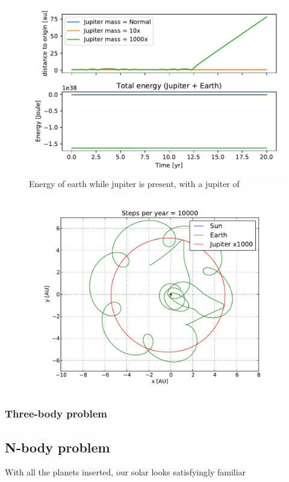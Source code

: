 \documentclass[10pt]{article}
\begin{document}
\begin{multicols}{2}
\begin{figure}[htpb]
    \centering
    \includegraphics[width=0.8\linewidth]{energyEarthJupiter.pdf}
    \caption{Energy of earth while jupiter is present, with a jupiter of  }
    \label{fig:energy_earthJupiter}
\end{figure}

\begin{figure}[H]
    \centering
    \includegraphics[width=1.0\linewidth]{../results/EJSx1000_1.pdf}
    \label{fig:jupiter1000x}
    \caption{}
\end{figure}

\subsubsection{Three-body problem}


\subsection{N-body problem}
With all the planets inserted, our solar looks satisfyingly familiar


\end{multicols}
\end{document}
